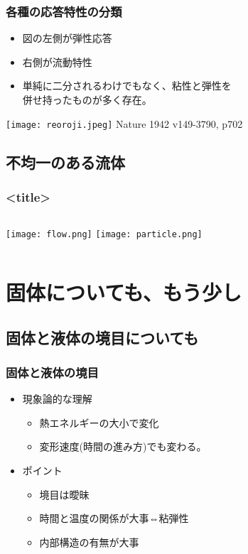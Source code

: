 \documentclass[12pt, dvipdfmx]{beamer}
\begin{document}
\begin{frame}
	\frametitle{各種の応答特性の分類}
		\begin{itemize}
			\item 図の左側が弾性応答
			\item 右側が流動特性
			\item 単純に二分されるわけでもなく、粘性と弾性を\\併せ持ったものが多く存在。
		\end{itemize}
			\texttt{[image: reoroji.jpeg]}
			Nature 1942 v149-3790, p702
\end{frame}


\subsection{不均一のある流体}
\begin{frame}
	\frametitle{<title>}
		\begin{columns}[T, onlytextwidth]
				\texttt{[image: flow.png]}
				\texttt{[image: particle.png]}
		\end{columns}
\end{frame}

\section{固体についても、もう少し}
\subsection{固体と液体の境目についても}
\begin{frame}
    \frametitle{固体と液体の境目}
    \begin{itemize}
        \item 現象論的な理解
            \begin{itemize}
                \item 熱エネルギーの大小で変化
                \item 変形速度(時間の進み方)でも変わる。
            \end{itemize}
        \item ポイント
            \begin{itemize}
                \item 境目は曖昧
                \item 時間と温度の関係が大事⇔粘弾性
                \item 内部構造の有無が大事
            \end{itemize}
    \end{itemize}
\end{frame}
\end{document}
